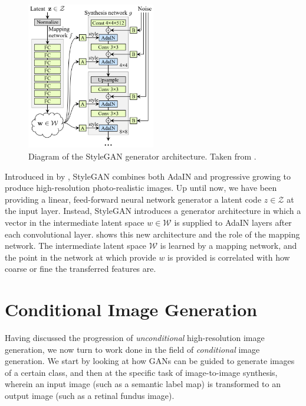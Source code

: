 \begin{figure}[h]
    \centering
    \includegraphics[width=0.5\textwidth]{background/figs/stylegan.png}
    \caption{Diagram of the StyleGAN generator architecture. Taken from \cite{stylegan}.}
    \label{fig:styleganarch}
\end{figure}

Introduced in \citeyear{stylegan} by \citeauthor{stylegan}, StyleGAN combines both AdaIN and progressive growing to produce high-resolution photo-realistic images.
Up until now, we have been providing a linear, feed-forward neural network generator a latent code $z \in \mathcal{Z}$ at the input layer.
Instead, StyleGAN introduces a generator architecture in which a vector in the intermediate latent space $w \in \mathcal{W}$ is supplied to AdaIN layers after each convolutional layer.
 shows this new architecture and the role of the mapping network.
The intermediate latent space $\mathcal{W}$ is learned by a mapping network, and the point in the network at which provide $w$ is provided is correlated with how coarse or fine the transferred features are.

\section{Conditional Image Generation}

Having discussed the progression of \emph{unconditional} high-resolution image generation, we now turn to work done in the field of \emph{conditional} image generation. 
We start by looking at how GANs can be guided to generate images of a certain class, and then at the specific task of image-to-image synthesis, wherein an input image (such as a semantic label map) is transformed to an output image (such as a retinal fundus image). 

